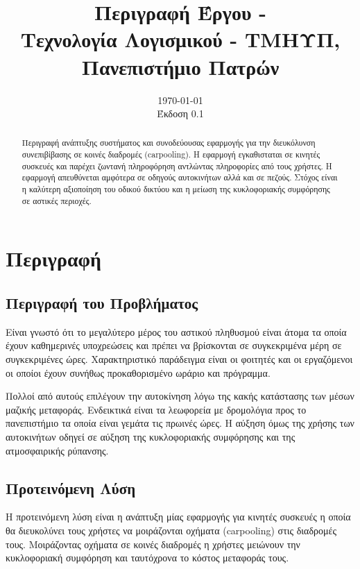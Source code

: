 \documentclass[11pt]{article}
\author{
    \developer{Γιάννης Ραβασόπουλος}{1100696}
    \developer{Κώστας Λουκανάρης}{1100610}
    \developer{Χρήστος Μάριος Νικολόπουλος}{1100644}
    \developer{Άγγελος Αβεντισιάν}{1100491}
    \developer{Βασίλης Μυλωνάς}{1100643}
}
\date{
    \today \\[1ex]
    Έκδοση 0.1 \\
}
\title{
    Περιγραφή Έργου - \appname\\[1ex]
    \large Τεχνολογία Λογισμικού - ΤΜΗΥΠ, Πανεπιστήμιο Πατρών \\[2ex]
}
\begin{document}
\maketitle
\thispagestyle{empty}
\newpage

\tableofcontents
\newpage

\begin{abstract}
    Περιγραφή ανάπτυξης συστήματος και συνοδεύουσας εφαρμογής για την διευκόλυνση
    συνεπιβίβασης σε κοινές διαδρομές (carpooling). Η εφαρμογή εγκαθισταται σε
    κινητές συσκευές και παρέχει ζωντανή πληροφόρηση
    αντλώντας πληροφορίες από τους χρήστες. H εφαρμογή απευθύνεται αμφότερα σε
    οδηγούς αυτοκινήτων αλλά και σε πεζούς. Στόχος είναι η καλύτερη αξιοποίηση
    του οδικού δικτύου και η μείωση της κυκλοφοριακής συμφόρησης σε αστικές
    περιοχές.
\end{abstract}

\newpage

\section{Περιγραφή}

\subsection{Περιγραφή του Προβλήματος}

Είναι γνωστό ότι το μεγαλύτερο μέρος του αστικού πληθυσμού είναι άτομα τα
οποία έχουν καθημερινές υποχρεώσεις και πρέπει να βρίσκονται
σε συγκεκριμένα μέρη σε συγκεκριμένες ώρες. Χαρακτηριστικό παράδειγμα είναι οι
φοιτητές και οι εργαζόμενοι οι οποίοι έχουν συνήθως προκαθορισμένο ωράριο και
πρόγραμμα.

Πολλοί από αυτούς επιλέγουν την αυτοκίνηση λόγω της κακής κατάστασης των μέσων
μαζικής μεταφοράς. Ενδεικτικά είναι τα λεωφορεία με δρομολόγια
προς το πανεπιστήμιο τα οποία είναι γεμάτα τις πρωινές ώρες. Η αύξηση όμως της
χρήσης των αυτοκινήτων οδηγεί σε αύξηση της κυκλοφοριακής συμφόρησης και
της ατμοσφαιρικής ρύπανσης.

\subsection{Προτεινόμενη Λύση}

Η προτεινόμενη λύση είναι η ανάπτυξη μίας εφαρμογής για κινητές συσκευές
η οποία θα διευκολύνει τους χρήστες να μοιράζονται οχήματα (carpooling) στις
διαδρομές τους. Μοιράζοντας οχήματα σε κοινές διαδρομές η χρήστες μειώνουν
την κυκλοφοριακή συμφόρηση και ταυτόχρονα το κόστος μεταφοράς τους.
\end{document}
